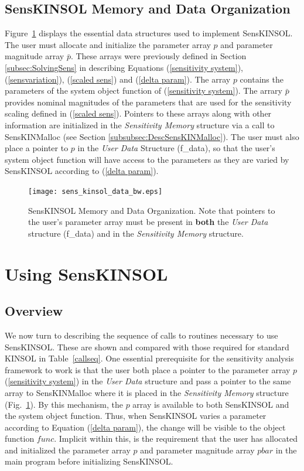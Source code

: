 \documentclass[11pt]{article}
\begin{document}
\subsection{SensKINSOL Memory and Data Organization}

\mbox{Figure \ref{mem structs}} displays the essential data structures
used to implement SensKINSOL. The user must allocate and initialize the
parameter array $p$ and parameter magnitude array $\bar{p}$. These
arrays were previously defined in Section \ref{subsec:SolvingSens} in
describing Equations (\ref{sensitivity system}), (\ref{sensvariation}),
(\ref{scaled sens}) and (\ref{delta param}). The array $p$ contains the
parameters of the system object function of (\ref{sensitivity system}).
The arrary $\bar p$ provides nominal magnitudes of the parameters that
are used for the sensitivity scaling defined in (\ref{scaled sens}).
Pointers to these arrays along with other information are initialized
in the {\em Sensitivity Memory} structure via a call to SensKINMalloc
(see Section \ref{subsubsec:DescSensKINMalloc}). The user must also
place a pointer to $p$ in the {\em User Data} Structure (f\_data), so
that the user's system object function will have access to the
parameters as they are varied by SensKINSOL according to
(\ref{delta param}).

\begin{figure}
\begin{center}
\texttt{[image: sens\_kinsol\_data\_bw.eps]}
\caption{SensKINSOL Memory and Data Organization. Note that pointers to
the user's parameter array must be present in {\bf both} the {\em User
Data} structure (f\_data) and in the {\em Sensitivity Memory}
structure.} \label{mem structs} \end{center} \end{figure}


\section{Using SensKINSOL}
\subsection{Overview}

We now turn to describing the sequence of calls to routines necessary
to use SensKINSOL. These are shown and compared with those required
for standard KINSOL in \mbox{Table \ref{callseq}}. One essential
prerequisite for the sensitivity analysis framework to work is that
the user both place a pointer to the parameter array $p$
(\ref{sensitivity system}) in the {\em User Data} structure and pass a
pointer to the same array to SensKINMalloc where it is placed in the
{\em Sensitivity Memory} structure (\mbox{Fig. \ref{mem structs}}). By
this mechanism, the $p$ array is available to both SensKINSOL and the
system object function. Thus, when SensKINSOL varies a parameter
according to Equation (\ref{delta param}), the change will be visible
to the object function $func$. Implicit within this, is the
requirement that the user has allocated and initialized the parameter
array $p$ and parameter magnitude array $pbar$ in the main program
before initializing SensKINSOL.
\end{document}
